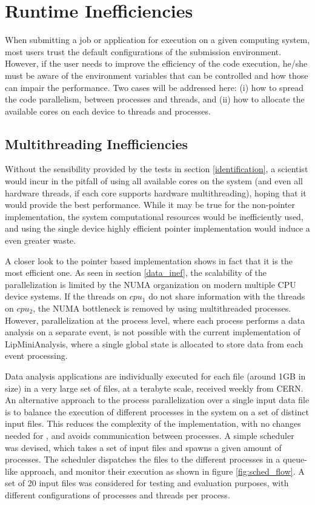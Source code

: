 \section{Runtime Inefficiencies}
\label{removal}

When submitting a job or application for execution on a given computing system, most users trust the default configurations of the submission environment. However, if the user needs to improve the efficiency of the code execution, he/she must be aware of the environment variables that can be controlled and how those can impair the performance. Two cases will be addressed here: (i) how to spread the code parallelism, between processes and threads, and (ii) how to allocate the available cores on each device to threads and processes.

\subsection{Multithreading Inefficiencies}

Without the sensibility provided by the tests in section \ref{identification}, a scientist would incur in the pitfall of using all available cores on the system (and even all hardware threads, if each core supports hardware multithreading), hoping that it would provide the best performance. While it may be true for the non-pointer implementation, the system computational resources would be inefficiently used, and using the single device highly efficient pointer implementation would induce a even greater waste.

A closer look to the pointer based implementation shows in fact that it is the most efficient one. As seen in section \ref{data_inef}, the scalability of the parallelization is limited by the NUMA organization on modern multiple CPU device systems. If the threads on $cpu_1$ do not share information with the threads on $cpu_2$, the NUMA bottleneck is removed by using multithreaded processes. However, parallelization at the process level, where each process performs a data analysis on a separate event, is not possible with the current implementation of LipMiniAnalysis, where a single global state is allocated to store data from each event processing.

Data analysis applications are individually executed for each file (around 1GB in size) in a very large set of files, at a terabyte scale, received weekly from CERN. An alternative approach to the process parallelization over a single input data file is to balance the execution of different \tth processes in the system on a set of distinct input files. This reduces the complexity of the implementation, with no changes needed for \tth, and avoids communication between processes. A simple scheduler was devised, which takes a set of input files and spawns a given amount of \tth processes. The scheduler dispatches the files to the different processes in a queue-like approach, and monitor their execution as shown in figure \ref{fig:sched_flow}. A set of 20 input files was considered for testing and evaluation purposes, with different configurations of processes and threads per process.


